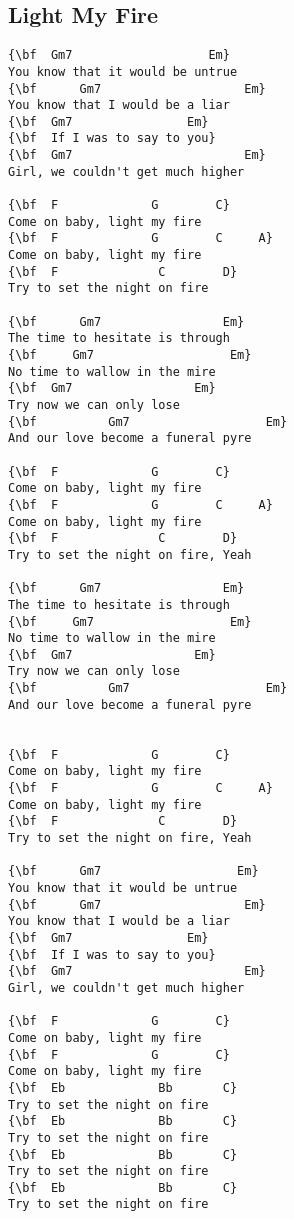 \documentclass[a4paper]{article}
\begin{document}
\subsection{Light My Fire}
\begin{multicols}{2}\begin{Verbatim}[commandchars=\\\{\}]
{\bf  Gm7                   Em}
You know that it would be untrue
{\bf      Gm7                    Em}
You know that I would be a liar
{\bf  Gm7                Em}
{\bf  If I was to say to you}
{\bf  Gm7                        Em}
Girl, we couldn't get much higher

{\bf  F             G        C}
Come on baby, light my fire
{\bf  F             G        C     A}
Come on baby, light my fire
{\bf  F              C        D}
Try to set the night on fire

{\bf      Gm7                 Em}
The time to hesitate is through
{\bf     Gm7                   Em}
No time to wallow in the mire
{\bf  Gm7                 Em}
Try now we can only lose
{\bf          Gm7                   Em}
And our love become a funeral pyre

{\bf  F             G        C}
Come on baby, light my fire
{\bf  F             G        C     A}
Come on baby, light my fire
{\bf  F              C        D}
Try to set the night on fire, Yeah

{\bf      Gm7                 Em}
The time to hesitate is through
{\bf     Gm7                   Em}
No time to wallow in the mire
{\bf  Gm7                 Em}
Try now we can only lose
{\bf          Gm7                   Em}
And our love become a funeral pyre


{\bf  F             G        C}
Come on baby, light my fire
{\bf  F             G        C     A}
Come on baby, light my fire
{\bf  F              C        D}
Try to set the night on fire, Yeah

{\bf      Gm7                   Em}
You know that it would be untrue
{\bf      Gm7                    Em}
You know that I would be a liar
{\bf  Gm7                Em}
{\bf  If I was to say to you}
{\bf  Gm7                        Em}
Girl, we couldn't get much higher

{\bf  F             G        C}
Come on baby, light my fire
{\bf  F             G        C}
Come on baby, light my fire
{\bf  Eb             Bb       C}
Try to set the night on fire
{\bf  Eb             Bb       C}
Try to set the night on fire
{\bf  Eb             Bb       C}
Try to set the night on fire
{\bf  Eb             Bb       C}
Try to set the night on fire 

\end{Verbatim}
\end{multicols}\newpage
\end{document}

